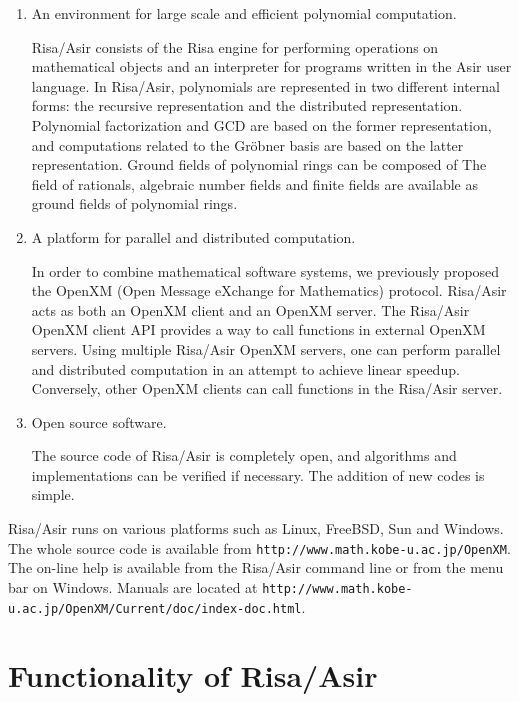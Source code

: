 \documentclass[12pt]{article}
\begin{document}
\begin{enumerate}
\item An environment for large scale and efficient polynomial computation.

Risa/Asir consists of the Risa engine for performing operations on
mathematical objects and an interpreter for programs written in
the Asir user language. In Risa/Asir, polynomials are
represented in two different internal forms: 
the recursive representation and the distributed representation.
Polynomial factorization and GCD are based on the former representation,
and computations related to the Gr\"obner basis are based on the latter
representation.
Ground fields of polynomial rings can be composed of 
The field of rationals, algebraic number fields and finite fields
are available as ground fields of polynomial rings.

\item A platform for parallel and distributed computation.

In order to  combine mathematical software systems,
we previously proposed the OpenXM 
(Open Message eXchange for Mathematics) 
protocol.
Risa/Asir acts as both an OpenXM client and an OpenXM server.
The Risa/Asir OpenXM client API provides a way to call 
functions in external OpenXM servers.
Using multiple Risa/Asir OpenXM servers,
one can perform parallel and distributed computation 
in an attempt to achieve linear speedup.
Conversely, other OpenXM clients can call functions in the Risa/Asir 
server. 

\item Open source software.

The source code of Risa/Asir is completely open, and algorithms and
implementations can be verified if necessary. The addition of new
codes is simple. 
\end{enumerate}

Risa/Asir runs on various platforms such as Linux, FreeBSD, Sun and
Windows. The whole source code is available from
{\tt http://www.math.kobe-u.ac.jp/OpenXM}.
The on-line help is available from the Risa/Asir command line or
from the menu bar on Windows. Manuals are located at 
{\tt http://www.math.kobe-u.ac.jp/OpenXM/Current/doc/index-doc.html}.

\section{Functionality of Risa/Asir}
\end{document}
